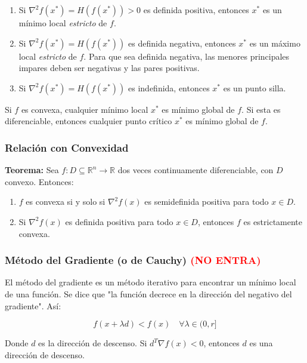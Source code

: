 \documentclass{article}
\begin{document}
\begin{enumerate}
    \item Si $\nabla^2f(x^*)=H(f(x^*)) > 0$ es definida positiva, entonces $x^*$ es un mínimo local \textit{estricto} de $f$.
    \item Si $\nabla^2f(x^*)=H(f(x^*))$ es definida negativa, entonces $x^*$ es un máximo local \textit{estricto} de $f$. Para que sea definida negativa, las menores principales impares deben ser negativas y las pares positivas.
    \item Si $\nabla^2f(x^*)=H(f(x^*))$ es indefinida, entonces $x^*$ es un punto silla.
\end{enumerate}

Si $f$ es convexa, cualquier mínimo local $x^*$ es mínimo global de $f$. Si esta es diferenciable, entonces cualquier punto crítico $x^*$ es mínimo global de $f$.

\subsubsection{Relación con Convexidad}

\textbf{Teorema:} Sea $f:D \subseteq \mathbb{R}^n \to \mathbb{R}$ dos veces continuamente diferenciable, con $D$ convexo. Entonces:

\begin{enumerate}
    \item $f$ es convexa si y solo si $\nabla^2 f(x)$ es semidefinida positiva para todo $x \in D$.
    \item Si $\nabla^2 f(x)$ es definida positiva para todo $x \in D$, entonces $f$ es estrictamente convexa.
\end{enumerate}

\subsubsection{Método del Gradiente (o de Cauchy) \textcolor{red}{(NO ENTRA)}}

El método del gradiente es un método iterativo para encontrar un mínimo local de una función. Se dice que "la función decrece en la dirección del negativo del gradiente". Así:

\begin{equation*}
    f(x+\lambda d) < f(x) \quad \forall \lambda \in (0, r]
\end{equation*}

Donde $d$ es la dirección de descenso. Si $d^T \nabla f(x) < 0$, entonces $d$ es una dirección de descenso.
\end{document}
